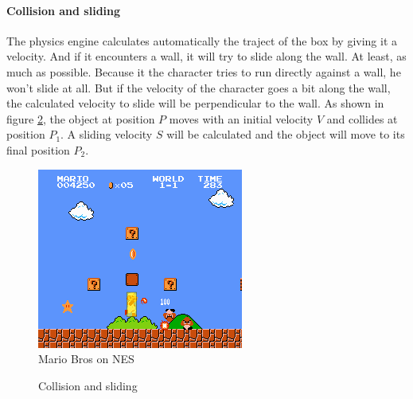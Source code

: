 \documentclass[10pt,a4paper]{article}
\begin{document}
\paragraph{Collision and sliding} The physics engine calculates automatically the traject of the box by giving it a velocity. And if it encounters a wall, it will try to slide along the wall. At least, as much as possible. Because it the character tries to run directly against a wall, he won't slide at all. But if the velocity of the character goes a bit along the wall, the calculated velocity to slide  will be perpendicular to the wall. As shown in figure \ref{fig:collision_sliding}, the object at position $P$ moves with an initial velocity $V$ and collides at position $P_1$. A sliding velocity $S$ will be calculated and the object will move to its final position $P_2$.

\begin{figure}[h]
\includegraphics[scale=1]{NES_Super_Mario_Bros.png} 
\caption{Mario Bros on NES}
\label{fig:mario_collision_shape}
\end{figure}

\begin{figure}[h]
\centering
{}
\caption{Collision and sliding}
\label{fig:collision_sliding}
\end{figure}
\end{document}

